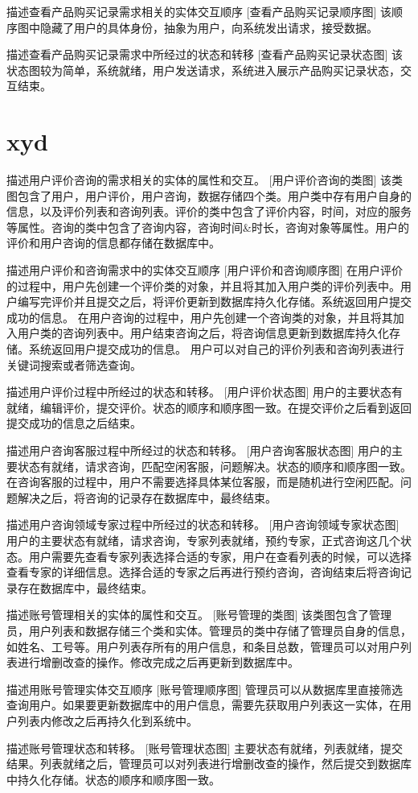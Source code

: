 描述查看产品购买记录需求相关的实体交互顺序
[查看产品购买记录顺序图]
该顺序图中隐藏了用户的具体身份，抽象为用户，向系统发出请求，接受数据。

描述查看产品购买记录需求中所经过的状态和转移
[查看产品购买记录状态图]
该状态图较为简单，系统就绪，用户发送请求，系统进入展示产品购买记录状态，交互结束。


\section{xyd}
描述用户评价咨询的需求相关的实体的属性和交互。
[用户评价咨询的类图]
该类图包含了用户，用户评价，用户咨询，数据存储四个类。用户类中存有用户自身的信息，以及评价列表和咨询列表。评价的类中包含了评价内容，时间，对应的服务等属性。咨询的类中包含了咨询内容，咨询时间&时长，咨询对象等属性。用户的评价和用户咨询的信息都存储在数据库中。

描述用户评价和咨询需求中的实体交互顺序
[用户评价和咨询顺序图]
在用户评价的过程中，用户先创建一个评价类的对象，并且将其加入用户类的评价列表中。用户编写完评价并且提交之后，将评价更新到数据库持久化存储。系统返回用户提交成功的信息。
在用户咨询的过程中，用户先创建一个咨询类的对象，并且将其加入用户类的咨询列表中。用户结束咨询之后，将咨询信息更新到数据库持久化存储。系统返回用户提交成功的信息。
用户可以对自己的评价列表和咨询列表进行关键词搜索或者筛选查询。

描述用户评价过程中所经过的状态和转移。
[用户评价状态图]
用户的主要状态有就绪，编辑评价，提交评价。状态的顺序和顺序图一致。在提交评价之后看到返回提交成功的信息之后结束。

描述用户咨询客服过程中所经过的状态和转移。
[用户咨询客服状态图]
用户的主要状态有就绪，请求咨询，匹配空闲客服，问题解决。状态的顺序和顺序图一致。在咨询客服的过程中，用户不需要选择具体某位客服，而是随机进行空闲匹配。问题解决之后，将咨询的记录存在数据库中，最终结束。

描述用户咨询领域专家过程中所经过的状态和转移。
[用户咨询领域专家状态图]
用户的主要状态有就绪，请求咨询，专家列表就绪，预约专家，正式咨询这几个状态。用户需要先查看专家列表选择合适的专家，用户在查看列表的时候，可以选择查看专家的详细信息。选择合适的专家之后再进行预约咨询，咨询结束后将咨询记录存在数据库中，最终结束。

描述账号管理相关的实体的属性和交互。
[账号管理的类图]
该类图包含了管理员，用户列表和数据存储三个类和实体。管理员的类中存储了管理员自身的信息，如姓名、工号等。用户列表存所有的用户信息，和条目总数，管理员可以对用户列表进行增删改查的操作。修改完成之后再更新到数据库中。

描述用账号管理实体交互顺序
[账号管理顺序图]
管理员可以从数据库里直接筛选查询用户。如果要更新数据库中的用户信息，需要先获取用户列表这一实体，在用户列表内修改之后再持久化到系统中。

描述账号管理状态和转移。
[账号管理状态图]
主要状态有就绪，列表就绪，提交结果。列表就绪之后，管理员可以对列表进行增删改查的操作，然后提交到数据库中持久化存储。状态的顺序和顺序图一致。